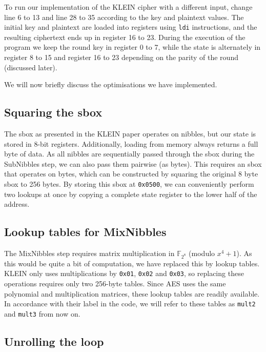 \documentclass[a4paper]{article}
\begin{document}
To run our implementation of the KLEIN cipher with a different input, change line 6 to 13 and line 28 to 35 according to the key and plaintext values. The initial key and plaintext are loaded into registers using \texttt{ldi} instructions, and the resulting ciphertext ends up in register 16 to 23. During the execution of the program we keep the round key in register 0 to 7, while the state is alternately in register 8 to 15 and register 16 to 23 depending on the parity of the round (discussed later).

We will now briefly discuss the optimisations we have implemented.


\subsection*{Squaring the sbox}

The sbox as presented in the KLEIN paper operates on nibbles, but our state is stored in 8-bit registers. Additionally, loading from memory always returns a full byte of data. As all nibbles are sequentially passed through the sbox during the SubNibbles step, we can also pass them pairwise (as bytes). This requires an sbox that operates on bytes, which can be constructed by squaring the original 8 byte sbox to 256 bytes. By storing this sbox at \texttt{0x0500}, we can conveniently perform two lookups at once by copying a complete state register to the lower half of the address.

\subsection*{Lookup tables for MixNibbles}

The MixNibbles step requires matrix multiplication in $\mathbb{F}_{2^8}$ (modulo $x^4 + 1$). As this would be quite a bit of computation, we have replaced this by lookup tables. KLEIN only uses multiplications by \texttt{0x01}, \texttt{0x02} and \texttt{0x03}, so replacing these operations requires only two 256-byte tables. Since AES uses the same polynomial and multiplication matrices, these lookup tables are readily available. In accordance with their label in the code, we will refer to these tables as \texttt{mult2} and \texttt{mult3} from now on.

\subsection*{Unrolling the loop}
\end{document}
